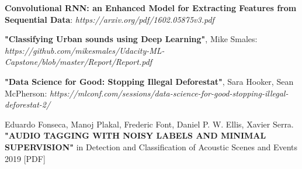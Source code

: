 \documentclass[11pt, a4papper]{report}
\theoremstyle{plain}
\theoremstyle{definition}
\theoremstyle{definition}
\theoremstyle{proposition}
\begin{document}
\begin{thebibliography}{1}
 \textbf{Convolutional RNN: an Enhanced Model for Extracting Features from Sequential Data}: \textit{https://arxiv.org/pdf/1602.05875v3.pdf}

 \textbf{"Classifying Urban sounds using Deep Learning"}, Mike Smales: \textit{https://github.com/mikesmales/Udacity-ML-Capstone/blob/master/Report/Report.pdf}

 \textbf{"Data Science for Good: Stopping Illegal Deforestat"}, Sara Hooker, Sean McPherson: \textit{https://mlconf.com/sessions/data-science-for-good-stopping-illegal-deforestat-2/}

 Eduardo Fonseca, Manoj Plakal, Frederic Font, Daniel P. W. Ellis, Xavier Serra.\\ \textbf{"AUDIO TAGGING WITH NOISY LABELS AND MINIMAL SUPERVISION"} in Detection and Classification of Acoustic Scenes and Events 2019 [PDF]
\end{thebibliography}
\end{document}
